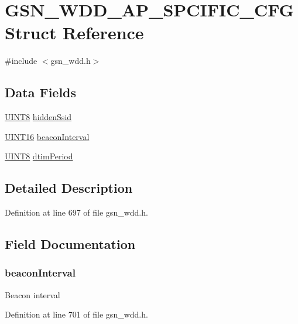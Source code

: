 \hypertarget{a00271}{
\section{GSN\_\-WDD\_\-AP\_\-SPCIFIC\_\-CFG Struct Reference}
\label{a00271}
}


{\ttfamily \#include $<$gsn\_\-wdd.h$>$}

\subsection*{Data Fields}
\begin{DoxyCompactItemize}
\item 
\hyperlink{a00660_gab27e9918b538ce9d8ca692479b375b6a}{UINT8} \hyperlink{a00271_a382a496c170fb8bfac376161ed8d00e6}{hiddenSsid}
\item 
\hyperlink{a00660_ga09f1a1fb2293e33483cc8d44aefb1eb1}{UINT16} \hyperlink{a00271_a54a6c03695574d9381214937f9dc6d57}{beaconInterval}
\item 
\hyperlink{a00660_gab27e9918b538ce9d8ca692479b375b6a}{UINT8} \hyperlink{a00271_a299cd846e383cf8f77d0c2e71083caba}{dtimPeriod}
\end{DoxyCompactItemize}


\subsection{Detailed Description}


Definition at line 697 of file gsn\_\-wdd.h.



\subsection{Field Documentation}
\hypertarget{a00271_a54a6c03695574d9381214937f9dc6d57}{
\subsubsection[{beaconInterval}]{ {\bf beaconInterval}}}
\label{a00271_a54a6c03695574d9381214937f9dc6d57}
Beacon interval 

Definition at line 701 of file gsn\_\-wdd.h.

